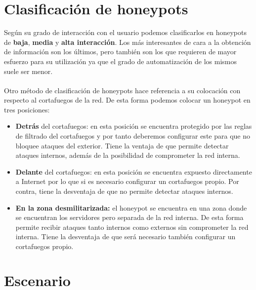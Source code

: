 \documentclass[journal]{IEEEtran}
\begin{document}
\section{Clasificación de honeypots}
Según su grado de interacción con el usuario podemos clasificarlos en honeypots de \textbf{baja}, \textbf{media} y \textbf{alta interacción}. Los más interesantes de cara a la obtención de información son los últimos, pero también son los que requieren de mayor esfuerzo para su utilización ya que el grado de automatización de los mismos suele ser menor.
\\\\
Otro método de clasificación de honeypots hace referencia a su colocación con respecto al cortafuegos de la red. De esta forma podemos colocar un honeypot en tres posiciones:

\begin{itemize}
	\item \textbf{Detrás} del cortafuegos: en esta posición se encuentra protegido por las reglas de filtrado del cortafuegos y por tanto deberemos configurar este para que no bloquee ataques del exterior. Tiene la ventaja de que permite detectar ataques internos, además de la posibilidad de comprometer la red interna.
	\item \textbf{Delante} del cortafuegos: en esta posición se encuentra expuesto directamente a Internet por lo que si es necesario configurar un cortafuegos propio. Por contra, tiene la desventaja de que no permite detectar ataques internos.
	\item \textbf{En la zona desmilitarizada:} el honeypot se encuentra en una zona donde se encuentran los servidores pero separada de la red interna. De esta forma permite recibir ataques tanto internos como externos sin comprometer la red interna. Tiene la desventaja de que será necesario también configurar un cortafuegos propio.
\end{itemize}


\section{Escenario}
\end{document}
